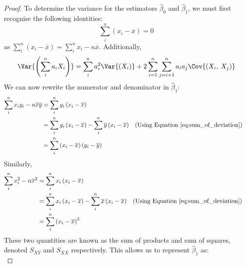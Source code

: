 \documentclass{article}
\begin{document}
\begin{proof}
    To determine the variance for the estimators \(\hat{\beta}_0\) and \(\hat{\beta}_1\), we must first recognise the following identities:
    \begin{equation}
        \sum_i^n \left( x_i - \overline{x} \right) = 0 \label{eq:sum_of_deviation}
    \end{equation}
    as \(\sum_i^n \left( x_i - \overline{x} \right) = \sum_i^n x_i - n \overline{x}\).
    Additionally,
    \begin{equation}
        \Var{\left(\sum_{i}^n a_i X_i\right)} = \sum_i^n a_i^2 \Var{\left(X_i\right)} + 2\sum_{i=1}^n\sum_{j=i+1}^n a_i a_j\Cov{\left(X_i,\:X_j\right)} \label{eq:variance_of_weighted_sums}
    \end{equation}
    We can now rewrite the numerator and denominator in \(\hat{\beta}_1\):
    \begin{align*}
        \sum_i^n x_i y_i - n \overline{x} \overline{y} & = \sum_i^n y_i \left( x_i - \overline{x} \right)                                                                                                                  \\
                                                       & = \sum_i^n y_i \left( x_i - \overline{x} \right) - \sum_i^n \overline{y} \left( x_i - \overline{x} \right) &  & \text{(Using Equation~\ref{eq:sum_of_deviation})} \\
                                                       & = \sum_i^n \left( x_i - \overline{x} \right) \left( y_i - \overline{y} \right)
    \end{align*}
    Similarly,
    \begin{align*}
        \sum_i^n x_i^2- n \overline{x}^2 & = \sum_i^n x_i \left( x_i - \overline{x} \right)                                                                                                                  \\
                                         & = \sum_i^n x_i \left( x_i - \overline{x} \right) - \sum_i^n \overline{x} \left( x_i - \overline{x} \right) &  & \text{(Using Equation~\ref{eq:sum_of_deviation})} \\
                                         & = \sum_i^n \left( x_i - \overline{x} \right)^2
    \end{align*}
    These two quantities are known as the sum of products and sum of squares, denoted \(S_{XY}\) and \(S_{XX}\) respectively.
    This allows us to represent \(\hat{\beta}_1\) as:
    \begin{equation*}

\end{equation*}
\end{proof}
\end{document}

